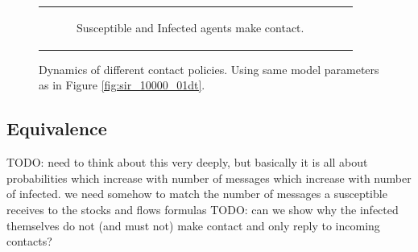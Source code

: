 \begin{figure}
\begin{center}
\begin{tabular}{c c}
\begin{subfigure}[b]{0.5\textwidth}
			\caption{Susceptible and Infected agents make contact.}
			\label{fig:sir_abs_correctness_contact_both}
		\end{subfigure}
	\end{tabular}
	
	\caption{Dynamics of different contact policies. Using same model parameters as in Figure \ref{fig:sir_10000_01dt}.} 
	\label{fig:sir_abs_correctness_contactpolicies}
\end{center}
\end{figure}

\subsection{Equivalence}
TODO: need to think about this very deeply, but basically it is all about probabilities which increase with number of messages which increase with number of infected. we need somehow to match the number of messages a susceptible receives to the stocks and flows formulas
TODO: can we show why the infected themselves do not (and must not) make contact and only reply to incoming contacts?